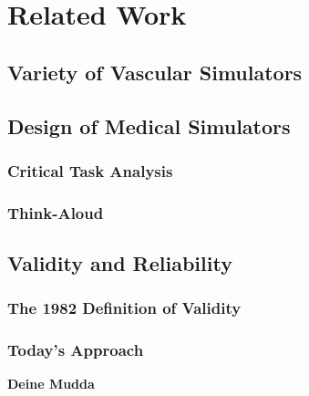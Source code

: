 \chapter{Related Work}\label{relatedwork}

\section{Variety of Vascular Simulators}

  
\section{Design of Medical Simulators}
\subsection{Critical Task Analysis}
\subsection{Think-Aloud}

\section{Validity and Reliability}
\subsection{The 1982 Definition of Validity}
\subsection{Today's Approach}

\textbf{Deine Mudda}\cite{latex}